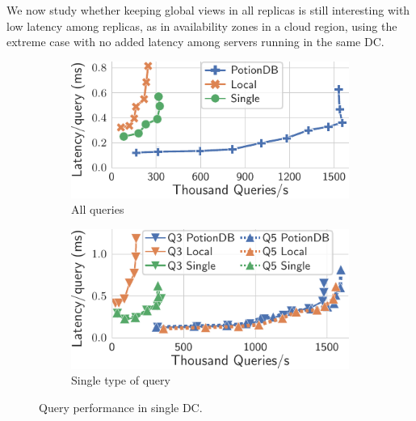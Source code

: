 \documentclass[sigplan,twocolumn,review,anonymous]{acmart}
\begin{document}
We now study whether keeping global views in all replicas is still interesting with low latency among replicas,
as in availability zones in a cloud region, using the extreme case with no added latency among servers running in the same DC.


\begin{figure}
	\centering
	\begin{subfigure}{.485\linewidth}
		\includegraphics[width=1\linewidth]{singleQuery/all_queries_noTC}
	\vspace{-15pt}
		\caption{All queries}
		\label{fig:all_queries_noTC}
	\end{subfigure}%
	\hspace*{0.4em}
	\begin{subfigure}{.485\linewidth}
		\includegraphics[width=1\linewidth]{singleQuery/q3_q5_noLatency}
	\vspace{-15pt}
			\caption{Single type of query}
		\label{fig:q3_q5_noTC}
	\end{subfigure}%
	\vspace{-10pt}
	\caption{Query performance in single DC.}
	\label{fig:global_local_single_noTC}
	\vspace{-15pt}
\end{figure}
\end{document}
